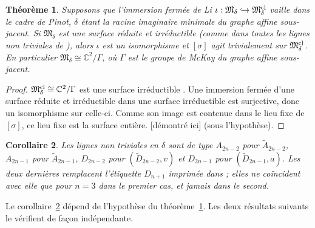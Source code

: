 \documentclass[11pt]{article}
\newtheorem{theorem}{Théorème}[section]
\newtheorem{corollary}[theorem]{Corollaire}
\theoremstyle{definition}
\theoremstyle{remark}
\newcommand{\tagP}{\textsf{\small[démontré ici]}}
\newcommand{\C}{\mathbb{C}}\newcommand{\R}{\mathbb{R}}\newcommand{\Z}{\mathbb{Z}}
\newcommand{\M}{\mathfrak{M}}\newcommand{\Rep}{\mathrm{Rep}}\newcommand{\SRep}{\mathrm{SRep}}
\begin{document}
\begin{theorem}\label{thm:A}
Supposons que l'immersion fermée de Li $\iota:\M_\delta\hookrightarrow\M^{\rm cl}_\delta$ vaille dans le cadre de Pinot, $\delta$ étant la racine imaginaire minimale du graphe affine sous-jacent. Si $\M_\delta$ est une surface réduite et irréductible (comme dans toutes les lignes non triviales de \cite[th.~1.2]{Pin26}), alors $\iota$ est un isomorphisme et $[\sigma]$ agit trivialement sur $\M^{\rm cl}_\delta$. En particulier $\M_\delta\cong\C^2/\Gamma$, où $\Gamma$ est le groupe de McKay du graphe affine sous-jacent.
\end{theorem}
\begin{proof}
$\M^{\rm cl}_\delta\cong\C^2/\Gamma$ est une surface irréductible \cite{Kro89,Nak94}. Une immersion fermée d'une surface réduite et irréductible dans une surface irréductible est surjective, donc un isomorphisme sur celle-ci. Comme son image est contenue dans le lieu fixe de $[\sigma]$, ce lieu fixe est la surface entière. \tagP{} (sous l'hypothèse).
\end{proof}

\begin{corollary}\label{cor:B}
Les lignes non triviales en $\delta$ sont de type $A_{2n-2}$ pour $\widetilde A_{2n-2}$, $A_{2n-1}$ pour $\widetilde A_{2n-1}$, $D_{2n-2}$ pour $(\widetilde D_{2n-2},v)$ et $D_{2n-1}$ pour $(\widetilde D_{2n-1},a)$. Les deux dernières remplacent l'étiquette $D_{n+1}$ imprimée dans \cite[th.~1.2]{Pin26} ; elles ne coïncident avec elle que pour $n=3$ dans le premier cas, et jamais dans le second.
\end{corollary}

Le corollaire~\ref{cor:B} dépend de l'hypothèse du théorème~\ref{thm:A}. Les deux résultats suivants le vérifient de façon indépendante.
\end{document}
